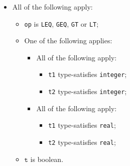 \documentclass{book}
\newcommand\vt[0]{\texttt{t}}
\begin{document}
\begin{itemize}
  \item All of the following apply:
    \begin{itemize}
    \item \texttt{op} is \texttt{LEQ}, \texttt{GEQ}, \texttt{GT} or \texttt{LT};
    \item One of the following applies:
      \begin{itemize}
      \item All of the following apply:
        \begin{itemize}
        \item \texttt{t1} type-satisfies \texttt{integer};
        \item \texttt{t2} type-satisfies \texttt{integer};
        \end{itemize}
      \item All of the following apply:
        \begin{itemize}
        \item \texttt{t1} type-satisfies \texttt{real};
        \item \texttt{t2} type-satisfies \texttt{real};
        \end{itemize}
      \end{itemize}
    \item $\vt$ is boolean.
    \end{itemize}


\end{itemize}
\end{document}
